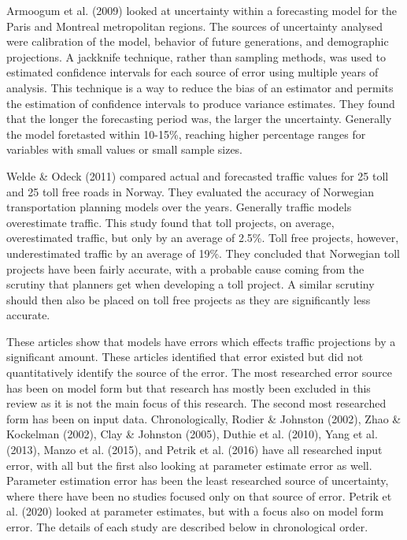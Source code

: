 \documentclass[fancy, masters, twoside]{byuthesis}
\begin{document}
Armoogum et al. (2009) looked at uncertainty within a forecasting model for the Paris and Montreal metropolitan regions. The sources of uncertainty analysed were calibration of the model, behavior of future generations, and demographic projections. A jackknife technique, rather than sampling methods, was used to estimated confidence intervals for each source of error using multiple years of analysis. This technique is a way to reduce the bias of an estimator and permits the estimation of confidence intervals to produce variance estimates. They found that the longer the forecasting period was, the larger the uncertainty. Generally the model foretasted within 10-15\%, reaching higher percentage ranges for variables with small values or small sample sizes.

Welde \& Odeck (2011) compared actual and forecasted traffic values for 25 toll and 25 toll free roads in Norway. They evaluated the accuracy of Norwegian transportation planning models over the years. Generally traffic models overestimate traffic. This study found that toll projects, on average, overestimated traffic, but only by an average of 2.5\%. Toll free projects, however, underestimated traffic by an average of 19\%. They concluded that Norwegian toll projects have been fairly accurate, with a probable cause coming from the scrutiny that planners get when developing a toll project. A similar scrutiny should then also be placed on toll free projects as they are significantly less accurate.

These articles show that models have errors which effects traffic projections by a significant amount. These articles identified that error existed but did not quantitatively identify the source of the error. The most researched error source has been on model form but that research has mostly been excluded in this review as it is not the main focus of this research. The second most researched form has been on input data. Chronologically, Rodier \& Johnston (2002), Zhao \& Kockelman (2002), Clay \& Johnston (2005), Duthie et al. (2010), Yang et al. (2013), Manzo et al. (2015), and Petrik et al. (2016) have all researched input error, with all but the first also looking at parameter estimate error as well. Parameter estimation error has been the least researched source of uncertainty, where there have been no studies focused only on that source of error. Petrik et al. (2020) looked at parameter estimates, but with a focus also on model form error. The details of each study are described below in chronological order.
\end{document}

